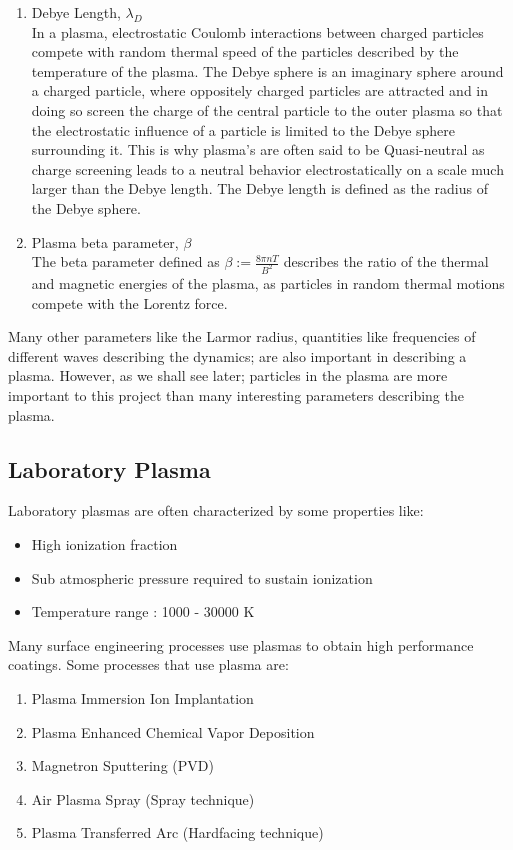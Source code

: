\documentclass[12pt]{article}
\begin{document}
\begin{enumerate}
		\item Debye Length, $\lambda_{D}$ \\
		In a plasma, electrostatic Coulomb interactions between charged particles compete with random thermal speed of the particles described by the temperature of the plasma. The Debye sphere is an imaginary sphere around a charged particle, where oppositely charged particles are attracted and in doing so screen the charge of the central particle to the outer plasma so that the electrostatic influence of a particle is limited to the Debye sphere surrounding it. This is why plasma's are often said to be Quasi-neutral as charge screening leads to a neutral behavior electrostatically on a scale much larger than the Debye length. The Debye length is defined as the radius of the Debye sphere.
		
		\item Plasma beta parameter, $\beta$ \\
		The beta parameter defined as $\beta := \frac{\displaystyle 8 \pi n T}{\displaystyle B^{2}}$ describes the ratio of the thermal and magnetic energies of the plasma, as particles in random thermal motions compete with the Lorentz force.
		
	\end{enumerate} 
		Many other parameters like the Larmor radius, quantities like frequencies of different waves describing the dynamics; are also important in describing a plasma. However, as we shall see later; particles in the plasma are more important to this project than many interesting parameters describing the plasma.
	
	\subsection{Laboratory Plasma}
	Laboratory plasmas are often characterized by some properties like:
	\begin{itemize}[itemsep=0cm]
		\item High ionization fraction
		\item Sub atmospheric pressure required to sustain ionization
		\item Temperature range : 1000 - 30000 K
	\end{itemize}

	\noindent Many surface engineering processes use plasmas to obtain high performance coatings. Some processes that use plasma are:
	\begin{enumerate}[itemsep=0cm]
		\item Plasma Immersion Ion Implantation
		\item Plasma Enhanced Chemical Vapor Deposition
		\item Magnetron Sputtering (PVD)
		\item Air Plasma Spray (Spray technique)
		\item Plasma Transferred Arc (Hardfacing technique)
	\end{enumerate}
	
\end{document}
